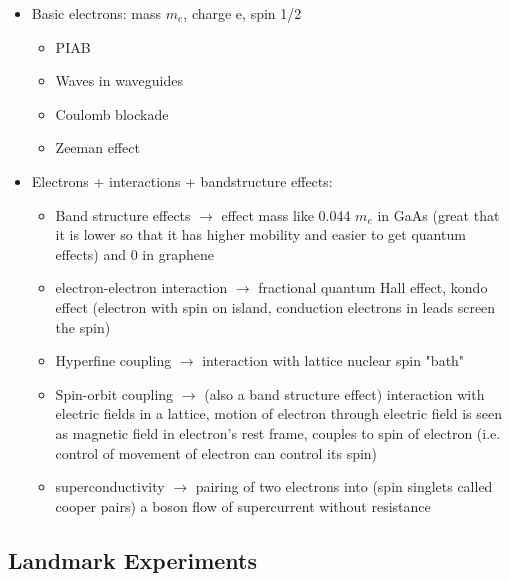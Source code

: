 \begin{itemize}
    \item Basic electrons: mass $m_e$, charge e, spin 1/2
          \begin{itemize}
              \item PIAB
              \item Waves in waveguides
              \item Coulomb blockade
              \item Zeeman effect
          \end{itemize}
    \item Electrons + interactions + bandstructure effects:
          \begin{itemize}
              \item Band structure effects $\rightarrow$ effect mass like 0.044 $m_e$ in GaAs (great that it is lower so that it has higher mobility and easier to get quantum effects) and 0 in graphene
              \item electron-electron interaction $\rightarrow$ fractional quantum Hall effect, kondo effect (electron with spin on island, conduction electrons in leads screen the spin)
              \item Hyperfine coupling $\rightarrow$ interaction with lattice nuclear spin "bath"
              \item Spin-orbit coupling $\rightarrow$ (also a band structure effect) interaction with electric fields in a lattice, motion of electron through electric field is seen as magnetic field in electron's rest frame, couples to spin of electron (i.e. control of movement of electron can control its spin)
              \item superconductivity $\rightarrow$ pairing of two electrons into (spin singlets called cooper pairs) a boson flow of supercurrent without resistance
          \end{itemize}
\end{itemize}

\subsection{Landmark Experiments}

